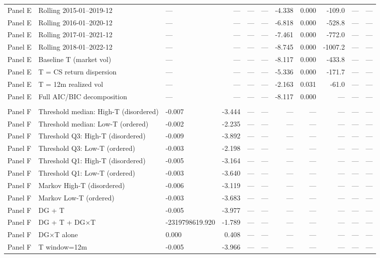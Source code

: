\begin{longtable}{lllrrrrrrrl}
Panel E & Rolling 2015-01–2019-12 & — & — & — & — & -4.338 & 0.000 & -109.0 & — & — \\
Panel E & Rolling 2016-01–2020-12 & — & — & — & — & -6.818 & 0.000 & -528.8 & — & — \\
Panel E & Rolling 2017-01–2021-12 & — & — & — & — & -7.461 & 0.000 & -772.0 & — & — \\
Panel E & Rolling 2018-01–2022-12 & — & — & — & — & -8.745 & 0.000 & -1007.2 & — & — \\
Panel E & Baseline T (market vol) & — & — & — & — & -8.117 & 0.000 & -433.8 & — & — \\
Panel E & T = CS return dispersion & — & — & — & — & -5.336 & 0.000 & -171.7 & — & — \\
Panel E & T = 12m realized vol & — & — & — & — & -2.163 & 0.031 & -61.0 & — & — \\
Panel E & Full AIC/BIC decomposition & — & — & — & — & -8.117 & 0.000 & — & — & — \\
\addlinespace
\multicolumn{11}{l}{\textit{Panel F: Regime Identification}} \\
Panel F & Threshold median: High-T (disordered) & -0.007 & -3.444 & — & — & — & — & — & — & — \\
Panel F & Threshold median: Low-T (ordered) & -0.002 & -2.235 & — & — & — & — & — & — & — \\
Panel F & Threshold Q3: High-T (disordered) & -0.009 & -3.892 & — & — & — & — & — & — & — \\
Panel F & Threshold Q3: Low-T (ordered) & -0.003 & -2.198 & — & — & — & — & — & — & — \\
Panel F & Threshold Q1: High-T (disordered) & -0.005 & -3.164 & — & — & — & — & — & — & — \\
Panel F & Threshold Q1: Low-T (ordered) & -0.003 & -3.640 & — & — & — & — & — & — & — \\
Panel F & Markov High-T (disordered) & -0.006 & -3.119 & — & — & — & — & — & — & — \\
Panel F & Markov Low-T (ordered) & -0.003 & -3.683 & — & — & — & — & — & — & — \\
Panel F & DG + T & -0.005 & -3.977 & — & — & — & — & — & — & — \\
Panel F & DG + T + DG×T & -2319798619.920 & -1.789 & — & — & — & — & — & — & — \\
Panel F & DG×T alone & 0.000 & 0.408 & — & — & — & — & — & — & — \\
Panel F & T window=12m & -0.005 & -3.966 & — & — & — & — & — & — & — \\

\end{longtable}
